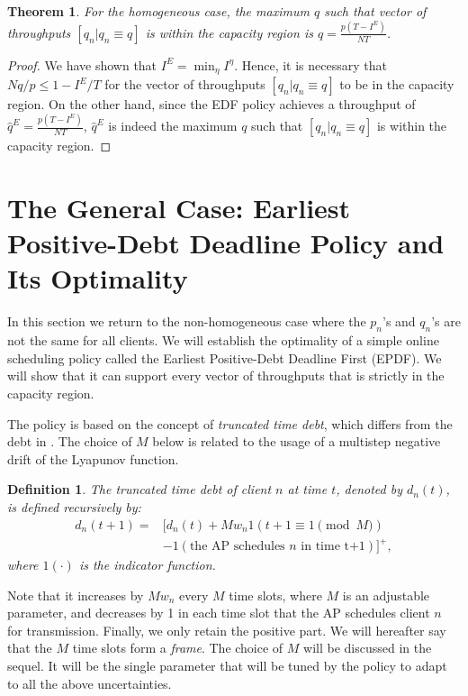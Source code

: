 \documentclass[10pt,nocopyrightspace]{sigplan-proc-varsize-1in}
\newtheorem{definition}{Definition}
\newtheorem{theorem}{Theorem}
\begin{document}
\begin{theorem}\label{t1}
For the homogeneous case, the maximum $q$ such that vector of throughputs $[q_n|q_n\equiv q]$ is within the capacity region is $q=\frac{p(T-I^E)}{NT}$.
\end{theorem}
\begin{proof}
We have shown that $I^E=\min_{\eta}I^\eta$. Hence, it is necessary that $Nq/p\leq 1 - I^E/T$ for the vector of throughputs $[q_n|q_n\equiv q]$ to be in the capacity region. On the other hand, since the EDF policy achieves a throughput of $\hat{q}^E=\frac{p(T-I^{E})}{NT}$, $\hat{q}^E$ is indeed the maximum $q$ such that $[q_n|q_n\equiv q]$ is within the capacity region.
\end{proof}




\section{The General Case: Earliest Positive-Debt Deadline Policy and Its Optimality}   \label{section:scheduling}

In this section we return to the non-homogeneous case where the $p_n$'s and $q_n$'s are not the same for all clients.  
We will establish the optimality of a simple online scheduling policy called the Earliest Positive-Debt Deadline First (EPDF). We will show that it
can support every vector of throughputs that
is strictly in the capacity region.  

The policy is based on the concept of \emph{truncated time debt}, which differs from the debt in \cite{IH09}. The choice of $M$ below is related to the usage of a multistep negative drift of the Lyapunov function.

\begin{definition}  \label{definition:scheduling:debt}
The \emph{truncated time debt} of client $n$ at time $t$, denoted by $d_n(t)$, is defined recursively by:
\begin{align*}
d_n(t+1) =& [d_n(t)+Mw_n1( t+1\equiv 1\pmod{M})\\
&-1(\mbox{the AP schedules $n$ in time t+1})]^+,
\end{align*}
where $1(\cdot)$ is the indicator function.
\end{definition}

Note that it increases by $Mw_n$ every $M$ time slots, where $M$ is an adjustable parameter, and decreases by 1 in each time slot that the AP schedules client $n$ for transmission. Finally, we only retain the positive part. We will hereafter say that the $M$ time slots form a \emph{frame}. The choice of $M$ will be discussed in the sequel. It will be the single parameter that will be tuned by the policy to adapt to all the above uncertainties.
\end{document}
